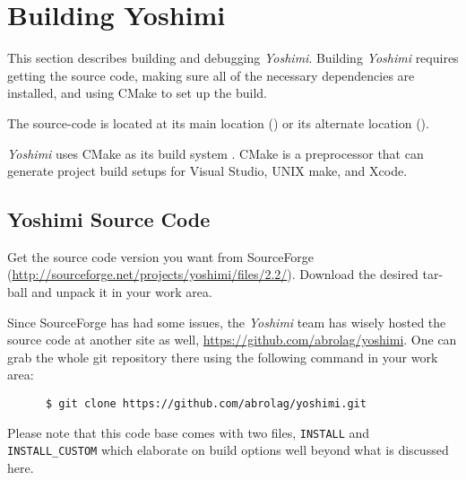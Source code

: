 %
%
%

\section{Building Yoshimi}
\label{sec:yoshimi_build}

   This section describes building and debugging \textsl{Yoshimi}.
   Building \textsl{Yoshimi} requires getting the source code, making sure
   all of the necessary dependencies are installed, and using CMake to set
   up the build.

   The source-code is located at its main location (\cite{yoshimi})
   or its alternate location (\cite{yoshimi2}).

   \textsl{Yoshimi} uses CMake as its build
   system \cite{zyncmake}.  CMake is a preprocessor that can generate
   project build setups for Visual Studio, UNIX make, and Xcode.

\subsection{Yoshimi Source Code}
\label{subsec:yoshimi_source_code}

   Get the source code version you want from SourceForge
   (\url{http://sourceforge.net/projects/yoshimi/files/2.2/}).
   Download the desired tar-ball and unpack it in your work area.

   Since SourceForge has had some issues, the \textsl{Yoshimi} team
   has wisely hosted the source code at another site as well,
   \url{https://github.com/abrolag/yoshimi}.  One can grab the whole
   git repository there using the following command in your work area:

   \begin{verbatim}
      $ git clone https://github.com/abrolag/yoshimi.git
   \end{verbatim}

   Please note that this code base comes with two files,
   \texttt{INSTALL} and \texttt{INSTALL\_CUSTOM} which elaborate on
   build options well beyond what is discussed here.

